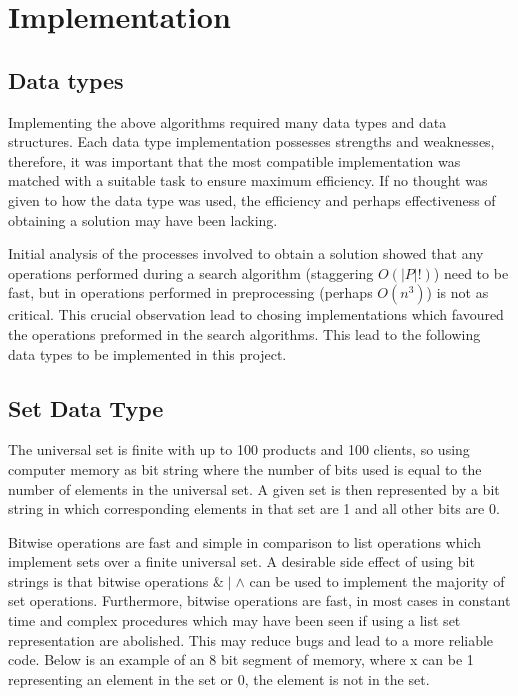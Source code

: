 \section{Implementation}

\subsection{Data types}
Implementing the above algorithms required many data types and data structures.
Each data type implementation possesses strengths and weaknesses, therefore, it
was important that the most compatible implementation was matched with a
suitable task to ensure maximum efficiency. If no thought was given to how the
data type was used, the efficiency and perhaps effectiveness of obtaining a
solution may have been lacking.

Initial analysis of the processes involved to obtain a solution showed that any
operations performed during a search algorithm (staggering $O(|P|!)$) need to
be fast, but in operations performed in preprocessing (perhaps $O(n^3)$) is not
as critical. This crucial observation lead to chosing implementations which
favoured the operations preformed in the search algorithms. This lead to the
following data types to be implemented in this project.
 
\subsection{Set Data Type}

The universal set is finite with up to 100 products and 100 clients, so using
computer memory as bit string where the number of bits used is equal to the
number of elements in the universal set. A given set is then represented by a
bit string in which corresponding elements in that set are 1 and all other bits
are 0.

Bitwise operations are fast and simple in comparison to list operations which
implement sets over a finite universal set. A desirable side effect of using
bit strings is that bitwise operations $\& \mid \wedge$ can be used to
implement the majority of set operations. Furthermore, bitwise operations are
fast, in most cases in constant time and complex procedures which may have been
seen if using a list set representation are abolished. This may reduce bugs and
lead to a more reliable code. Below is an example of an 8 bit segment of
memory, where x can be 1 representing an element in the set or 0, the element
is not in the set.


